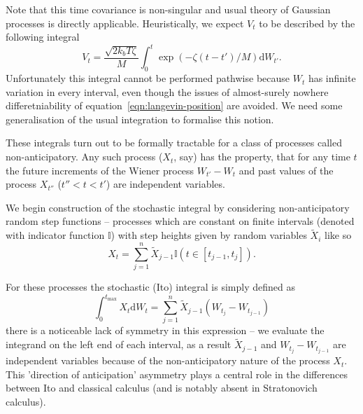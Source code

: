 \documentclass{doctoral}
\newcommand{\dd}{\mathrm{d}}
\begin{document}
Note that this time covariance is non-singular and usual theory of Gaussian processes is directly applicable.
Heuristically, we expect $V_t$ to be described by the following integral
\begin{equation}
    V_t = \frac{\sqrt{2 k_b T \zeta}}{M} \int_0^t \exp\left( -\zeta(t - t')/M \right) \dd W_{t'}.
    \label{eqn:velocity-integral-sde}
\end{equation}
Unfortunately this integral cannot be performed pathwise because $W_t$ has infinite variation in every interval, even though the issues of almost-surely nowhere differetniability of equation~\eqref{eqn:langevin-position} are avoided.
We need some generalisation of the usual integration to formalise this notion.

These integrals turn out to be formally tractable for a class of processes called non-anticipatory.
Any such process ($X_t$, say) has the property, that for any time $t$ the future increments of the Wiener process $W_{t'} - W_t$ and past values of the process $X_{t''}$ ($t'' < t < t'$) are independent variables.

We begin construction of the stochastic integral by considering non-anticipatory random step functions -- processes which are constant on finite intervals (denoted with indicator function $\mathbb{I}$) with step heights given by random variables $\widetilde{X}_{i}$ like so
\begin{equation}
    X_t = \sum_{j=1}^{n} \widetilde{X}_{j-1} \mathbb{I}(t \in [t_{j-1},t_j]).
    \label{eqn:random-step-function}
\end{equation}

For these processes the stochastic (Ito) integral is simply defined as
\begin{equation}
    \int_0^{t_{\mathrm{max}}} X_t \dd W_t = \sum_{j=1}^{n} \widetilde{X}_{j-1} (W_{t_j} - W_{t_{j-1}}) \label{eqn:ito-integral-step-function}
\end{equation}
there is a noticeable lack of symmetry in this expression -- we evaluate the integrand on the left end of each interval, as a result $\widetilde{X}_{j-1}$ and $W_{t_j} - W_{t_{j-1}}$ are independent variables because of the non-anticipatory nature of the process $X_t$.
This 'direction of anticipation' asymmetry plays a central role in the differences between Ito and classical calculus (and is notably absent in Stratonovich calculus).
\end{document}
